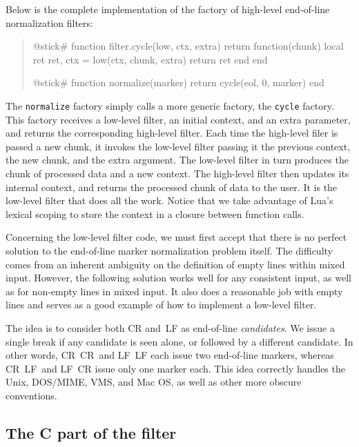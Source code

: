 \documentclass[10pt]{article}
\begin{document}
Below is the complete implementation of the factory of high-level
end-of-line normalization filters:
\begin{quote}
\begin{lua}
@stick#
function filter.cycle(low, ctx, extra)
  return function(chunk)
    local ret
    ret, ctx = low(ctx, chunk, extra)
    return ret
  end
end
%

@stick#
function normalize(marker)
  return cycle(eol, 0, marker)
end
%
\end{lua}
\end{quote}

The \texttt{normalize} factory simply calls a more generic
factory, the \texttt{cycle} factory. This factory receives a
low-level filter, an initial context, and an extra
parameter, and returns the corresponding high-level filter.
Each time the high-level filer is passed a new chunk, it
invokes the low-level filter passing it the previous
context, the new chunk, and the extra argument. The
low-level filter in turn produces the chunk of processed
data and a new context. The high-level filter then updates
its internal context, and returns the processed chunk of
data to the user.  It is the low-level filter that does all
the work.  Notice that we take advantage of Lua's lexical
scoping to store the context in a closure between function
calls.  

Concerning the low-level filter code, we must first accept
that there is no perfect solution to the end-of-line marker
normalization problem itself. The difficulty comes from an
inherent ambiguity on the definition of empty lines within
mixed input. However, the following solution works well for
any consistent input, as well as for non-empty lines in
mixed input. It also does a reasonable job with empty lines
and serves as a good example of how to implement a low-level
filter.

The idea is to consider both CR and~LF as end-of-line
\emph{candidates}.  We issue a single break if any candidate
is seen alone, or followed by a different candidate.  In
other words, CR~CR~and LF~LF each issue two end-of-line
markers, whereas CR~LF~and LF~CR issue only one marker each.
This idea correctly handles the Unix, DOS/MIME, VMS, and Mac
OS, as well as other more obscure conventions.

\subsection{The C part of the filter}
\end{document}
